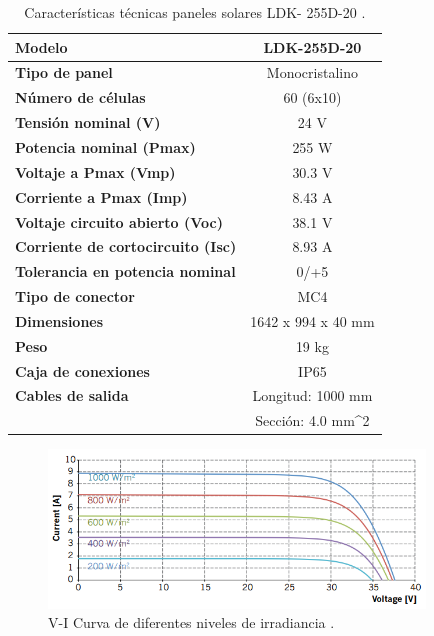 \begin{table}[H]
	\centering
	\caption{Características técnicas paneles solares LDK- 255D-20 \cite{DDE1}.}
	\begin{tabular}{|l|p{12.93em}|}
		\hline
		\textbf{Modelo} & \multicolumn{1}{c|}{LDK-255D-20} \\
		\hline
		\textbf{Tipo de panel} & \multicolumn{1}{c|}{Monocristalino} \\
		\hline
		\textbf{Número de células } & \multicolumn{1}{c|}{60 (6x10)} \\
		\hline
		\textbf{Tensión nominal (V)} & \multicolumn{1}{c|}{24 V} \\
		\hline
		\textbf{Potencia nominal (Pmax)} & \multicolumn{1}{c|}{255 W} \\
		\hline
		\textbf{Voltaje a Pmax (Vmp)} & \multicolumn{1}{c|}{30.3 V} \\
		\hline
		\textbf{Corriente a Pmax (Imp)} & \multicolumn{1}{c|}{8.43 A} \\
		\hline
		\textbf{Voltaje circuito abierto (Voc)} & \multicolumn{1}{c|}{38.1 V} \\
		\hline
		\textbf{Corriente de cortocircuito (Isc)} & \multicolumn{1}{c|}{8.93 A} \\
		\hline
		\textbf{Tolerancia en potencia nominal} & \multicolumn{1}{c|}{0/+5} \\
		\hline
		\textbf{Tipo de conector} & \multicolumn{1}{c|}{MC4} \\
		\hline
		\textbf{Dimensiones} & \multicolumn{1}{c|}{1642 x 994 x 40 mm} \\
		\hline
		\textbf{Peso} & \multicolumn{1}{c|}{19 kg} \\
		\hline
		\textbf{Caja de conexiones} & \multicolumn{1}{c|}{IP65} \\
		\hline
		\textbf{Cables de salida } & \multicolumn{1}{c|}{Longitud: 1000 mm} \\
		\textbf{} & \multicolumn{1}{c|}{Sección: 4.0 mm^2} \\
		\hline
	\end{tabular}%
	\label{tab:tabla_LDK}%
\end{table}%

\begin{figure}[H]
	\centering
	\includegraphics[width=10cm]{imagenes/VIpaneles}
	\caption{V-I Curva de diferentes niveles de irradiancia \cite{DDE1}.}
	\label{fig:VIcurva}
\end{figure}


